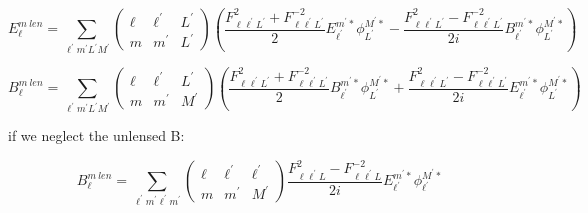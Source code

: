 \documentclass[12pt]{article}
\begin{document}
\begin{equation}
  E_{\ell}^{m \mathrm\ {len}} = \sum_{\ell^{\prime} m^{\prime} L^{\prime} M^{\prime}} \left(\begin{array}{ccc}{\ell} & {\ell^{\prime}} & {L^{\prime}} \\ {m} & {m^{\prime}} & {L}^{\prime}\end{array}\right) \left(\frac{F_{\ell \ell^{\prime} L^{\prime}}^{2}+F_{\ell \ell^{\prime} L^{\prime}}^{-2}}{2}E_{\ell^{\prime}}^{ m^{\prime} {*}} \phi_{L^{\prime} }^{M^{\prime}{*}}-\frac{F_{\ell \ell^{\prime} L^{\prime}}^{2}-F_{\ell \ell^{\prime} L^{\prime}}^{-2}}{2 i}B_{\ell^{\prime} }^{m^{\prime} {*}} \phi_{L^{\prime}}^{M^{\prime} {*}}\right)
  
\end{equation}
  


\begin{equation}
  B_{\ell}^{m \mathrm\ {len}}=\sum_{\ell^{\prime} m^{\prime} L^{\prime} M^{\prime}} \left(\begin{array}{ccc}{\ell} & {\ell^{\prime}} & {L^{\prime}} \\ {m} & {m^{\prime}} & {M}^{\prime}\end{array}\right) \left(\frac{F_{\ell \ell^{\prime} L^{\prime}}^{2}+F_{\ell \ell^{\prime} L^{\prime}}^{-2}}{2}B_{\ell^{\prime}}^{ m^{\prime} {*}} \phi_{L^{\prime} }^{ M^{\prime} {*}}+\frac{F_{\ell \ell^{\prime} L^{\prime}}^{2}-F_{\ell \ell^{\prime} L^{\prime}}^{-2}}{2 i}E_{\ell^{\prime}}^{ m^{\prime} {*}} \phi_{L^{\prime}}^{ M^{\prime} {*}}\right)
\end{equation}


if we neglect the unlensed B:

\begin{equation}
  B_{\ell}^{m \mathrm \ {len}}=\sum_{\ell^{\prime} m^{\prime} \ell^{\prime} m^{\prime}} \left(\begin{array}{ccc}{\ell} & {\ell^{\prime}} & {\ell^{\prime}} \\ {m} & {m^{\prime}} & {M}^{\prime}\end{array}\right) \frac{F_{\ell \ell^{\prime} L}^{2}-F_{\ell \ell^{\prime} L}^{-2}}{2i} E_{\ell^{\prime}}^{ m^{\prime} {*}} \phi_{\ell^{\prime}}^{ M^{\prime} {*}}
 
\end{equation}
\end{document}
